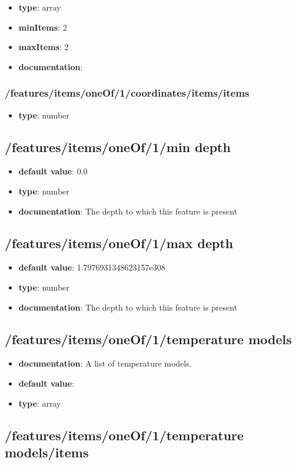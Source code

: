\begin{itemize}\item {\bf type}: array
\item {\bf minItems}: 2
\item {\bf maxItems}: 2
\item {\bf documentation}: 
\end{itemize}\subsubsection{/features/items/oneOf/1/coordinates/items/items}
\begin{itemize}\item {\bf type}: number
\end{itemize}\subsection{/features/items/oneOf/1/min depth}
\begin{itemize}\item {\bf default value}: 0.0
\item {\bf type}: number
\item {\bf documentation}: The depth to which this feature is present
\end{itemize}\subsection{/features/items/oneOf/1/max depth}
\begin{itemize}\item {\bf default value}: 1.7976931348623157e308
\item {\bf type}: number
\item {\bf documentation}: The depth to which this feature is present
\end{itemize}\subsection{/features/items/oneOf/1/temperature models}
\begin{itemize}\item {\bf documentation}: A list of temperature models.
\item {\bf default value}: 
\item {\bf type}: array
\end{itemize}\subsection{/features/items/oneOf/1/temperature models/items}

